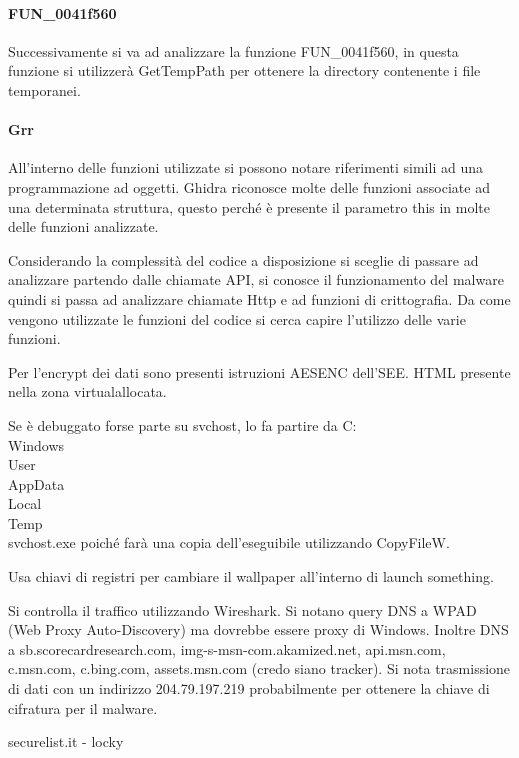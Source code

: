 \documentclass[]{article}
\begin{document}
\paragraph{FUN\_0041f560}
Successivamente si va ad analizzare la funzione FUN\_0041f560, in questa funzione si utilizzerà GetTempPath per ottenere la directory contenente i file temporanei. 

\paragraph{Grr}
All'interno delle funzioni utilizzate si possono notare riferimenti simili ad una programmazione ad oggetti. Ghidra riconosce molte delle funzioni associate ad una determinata struttura, questo perché è presente il parametro this in molte delle funzioni analizzate. 


Considerando la complessità del codice a disposizione si sceglie di passare ad analizzare partendo dalle chiamate API, si conosce il funzionamento del malware quindi si passa ad analizzare chiamate Http e ad funzioni di crittografia. Da come vengono utilizzate le funzioni del codice si cerca capire l'utilizzo delle varie funzioni. 

Per l'encrypt dei dati sono presenti istruzioni AESENC dell'SEE. HTML presente nella zona virtualallocata.

Se è debuggato forse parte su svchost, lo fa partire da C:\\Windows\\User\\AppData\\Local\\Temp\\svchost.exe poiché farà una copia dell'eseguibile utilizzando CopyFileW.

Usa chiavi di registri per cambiare il wallpaper all'interno di launch something. 

Si controlla il traffico utilizzando Wireshark. Si notano query DNS a WPAD (Web Proxy Auto-Discovery) ma dovrebbe essere proxy di Windows. Inoltre DNS a sb.scorecardresearch.com, img-s-msn-com.akamized.net, api.msn.com, c.msn.com, c.bing.com, assets.msn.com (credo siano tracker). Si nota trasmissione di dati con un indirizzo 204.79.197.219 probabilmente per ottenere la chiave di cifratura per il malware. 

securelist.it - locky
\end{document}
